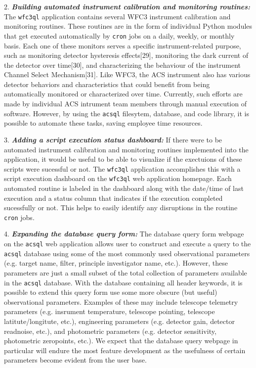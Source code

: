 \documentclass[10pt,journal,compsoc]{IEEEtran}
\begin{document}
2. \textbf{\textit{Building automated instrument calibration and monitoring routines:}}  The \texttt{wfc3ql} application contains several WFC3 instrument calibration and monitoring routines.  These
routines are in the form of individual Python modules that get executed automatically by \texttt{cron} jobs on a daily, weekly, or monthly basis.  Each one of these monitors serves a specific
instrument-related purpose, such as monitoring detector hysteresis effects[29], monitoring the dark current of the detector over time[30], and characterizing the behaviour of the instrument
Channel Select Mechanism[31].  Like WFC3, the ACS instrument also has various detector behaviors and characteristics that could benefit from being automatically monitored or characterized
over time.  Currently, such efforts are made by individual ACS intrument team members through manual execution of software.  However, by using the \texttt{acsql} filesytem, database, and code library,
it is possible to automate these tasks, saving employee time resources.

3. \textbf{\textit{Adding a script execution status dashboard:}}  If there were to be automated instrument calibration and monitoring routines implemented into the application, it would be useful to
be able to visualize if the exectuions of these scripts were sucessful or not.  The \texttt{wfc3ql} application accomplishes this with a script execution dashboard on the \texttt{wfc3ql} web application
homepage.  Each automated routine is labeled in the dashboard along with the date/time of last execution and a status column that indicates if the execution completed sucessfully or not.  This helps to
easily identify any disruptions in the routine \texttt{cron} jobs.

4. \textbf{\textit{Expanding the database query form:}}  The database query form webpage on the \texttt{acsql} web application allows user to construct and execute a query to the \texttt{acsql} database
using some of the most commonly used observational parameters (e.g. target name, filter, principle investigator name, etc.).  However, these parameters are just a small subset of the total collection
of parameters available in the \texttt{acsql} database.  With the database containing all header keywords, it is possible to extend this query form use some more obscure (but useful) observational parameters.
Examples of these may include telescope telemetry parameters (e.g. insrument temperature, telescope pointing, telescope latitute/longitute, etc.), engineering parameters (e.g. detector gain, detector
readnoise, etc.), and photometric parameters (e.g. detector sensitivity, photometric zeropoints, etc.).  We expect that the database query webpage in particular will endure the most feature development
as the usefulness of certain parameters become evident from the user base.
\end{document}

